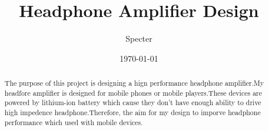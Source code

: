 \documentclass[a4paper,12pt ]{report}
\title{  Headphone Amplifier Design	 }
\author{Specter}
\date{\today}
\begin{document}
 

\begin{abstract}
	The purpose of this project is designing a hign performance headphone amplifier.My headfore amplifier is designed for mobile phones or mobile players.These devices are powered by lithium-ion battery which cause they don't have enough ability to drive high impedence headphone.Therefore, the aim for my design to imporve headphone performance which used with mobile devices.
\end{abstract}
\tableofcontents 
\listoffigures 

	






\end{document}
